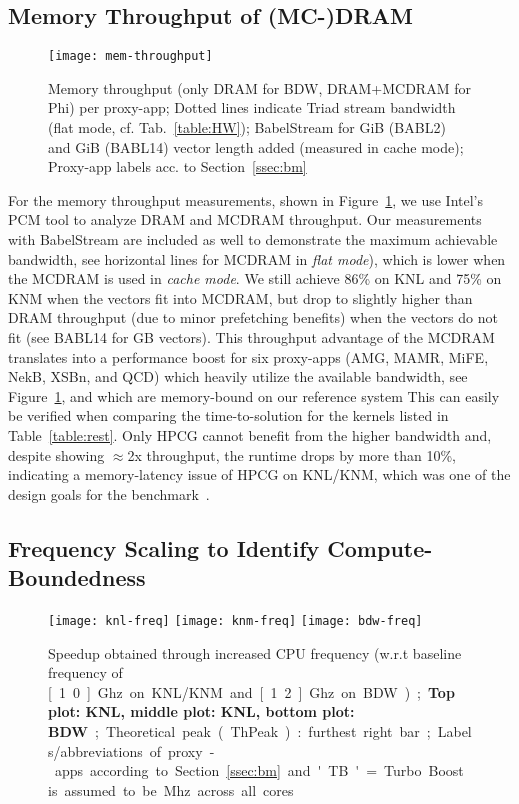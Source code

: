 \subsection{Memory Throughput of (MC-)DRAM}\label{ssec:eval_mem}
%
\begin{figure}[tbp]
    \centering
    \texttt{[image: mem-throughput]}
    \caption{\label{fig:memthru} Memory throughput (only DRAM for BDW, DRAM+MCDRAM for Phi) per proxy-app; Dotted lines indicate Triad stream bandwidth (flat mode, cf. Tab.~\ref{table:HW}); BabelStream for \unit[2]{GiB} (BABL2) and \unit[14]{GiB} (BABL14) vector length added (measured in cache mode); Proxy-app labels acc. to Section~\ref{ssec:bm}}
\end{figure}
%
For the memory throughput measurements, shown in Figure~\ref{fig:memthru}, we use Intel's PCM tool to analyze DRAM and MCDRAM throughput.
Our measurements with BabelStream are included as well to demonstrate the maximum achievable bandwidth, see horizontal lines for MCDRAM
in \textit{flat mode}), which is lower when the MCDRAM is used in \textit{cache mode}.
We still achieve 86\% on KNL and 75\% on KNM when the vectors fit into MCDRAM, but drop to slightly
higher than DRAM throughput (due to minor prefetching benefits) when the vectors do not fit (see BABL14 for \unit[14]{GB} vectors).
This throughput advantage of the MCDRAM translates into a performance boost for six proxy-apps (AMG, MAMR, MiFE, NekB, XSBn, and QCD)
which heavily utilize the available bandwidth, see Figure~\ref{fig:memthru}, and which are memory-bound on our reference system
This can easily be verified when comparing the time-to-solution for the kernels listed in Table~\ref{table:rest}.
Only HPCG cannot benefit from the higher bandwidth and, despite showing $\approx$2x throughput, the runtime drops by more than 10\%,
indicating a memory-latency issue of HPCG on KNL/KNM, which was one of the design goals for the benchmark~\cite{dongarra_new_2016}.
%

\subsection{Frequency Scaling to Identify Compute-Boundedness}\label{ssec:eval_freq}
%
\begin{figure}[tbp]
    \centering
    \texttt{[image: knl-freq]}
    \texttt{[image: knm-freq]}
    \texttt{[image: bdw-freq]}
    \caption{\label{fig:freq} Speedup obtained through increased CPU frequency (w.r.t baseline frequency of \unit[1.0]{Ghz} on KNL/KNM and \unit[1.2]{Ghz} on BDW); \textbf{Top plot: KNL, middle plot: KNL, bottom plot: BDW}; Theoretical peak (ThPeak): furthest right bar; Labels/abbreviations of proxy-apps according to Section~\ref{ssec:bm} and 'TB' = Turbo Boost is assumed to be \unit[100]{Mhz} across all cores}
\end{figure}

